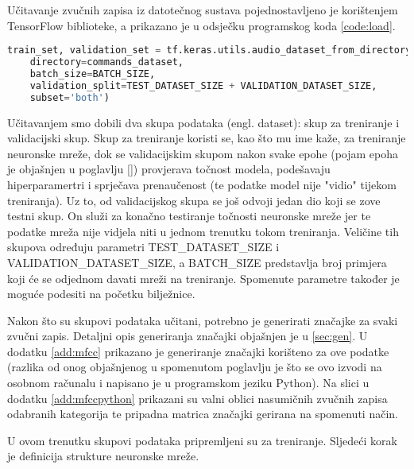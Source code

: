 Učitavanje zvučnih zapisa iz datotečnog sustava pojednostavljeno je korištenjem
TensorFlow biblioteke, a prikazano je u odsječku programskog koda \ref{code:load}.

\begin{lstlisting}[language=Python, caption=Učitavanje zvučnih zapisa, label=code:load]
train_set, validation_set = tf.keras.utils.audio_dataset_from_directory(
    directory=commands_dataset,
    batch_size=BATCH_SIZE,
    validation_split=TEST_DATASET_SIZE + VALIDATION_DATASET_SIZE,
    subset='both')
\end{lstlisting}

Učitavanjem smo dobili dva skupa podataka (engl. dataset): skup za treniranje i validacijski skup.
Skup za treniranje koristi se, kao što mu ime kaže, za treniranje neuronske mreže,
dok se validacijskim skupom nakon svake epohe (pojam epoha je objašnjen u poglavlju \ref{}) 
provjerava točnost modela, podešavaju
hiperparamertri i sprječava prenaučenost (te podatke model nije "vidio" tijekom treniranja).
Uz to, od validacijskog skupa se još odvoji jedan dio koji se zove testni skup. On služi
za konačno testiranje točnosti neuronske mreže jer te podatke mreža nije vidjela niti
u jednom trenutku tokom treniranja. Veličine tih skupova određuju parametri 
TEST\_DATASET\_SIZE i VALIDATION\_DATASET\_SIZE, a BATCH\_SIZE predstavlja
broj primjera koji će se odjednom davati mreži na treniranje. Spomenute parametre
također je moguće podesiti na početku bilježnice. 

Nakon što su skupovi podataka učitani, potrebno je generirati značajke za svaki zvučni zapis.
Detaljni opis generiranja značajki objašnjen je u \ref{sec:gen}. U dodatku \ref{add:mfcc} prikazano
je generiranje značajki korišteno za ove podatke (razlika od onog objašnjenog u spomenutom poglavlju
je što se ovo izvodi na osobnom računalu i napisano je u programskom jeziku Python).
Na slici u dodatku \ref{add:mfccpython} prikazani su valni oblici nasumičnih zvučnih zapisa odabranih 
kategorija te pripadna matrica značajki gerirana na spomenuti način.

U ovom trenutku skupovi podataka pripremljeni su za treniranje. Sljedeći korak je definicija 
strukture neuronske mreže.